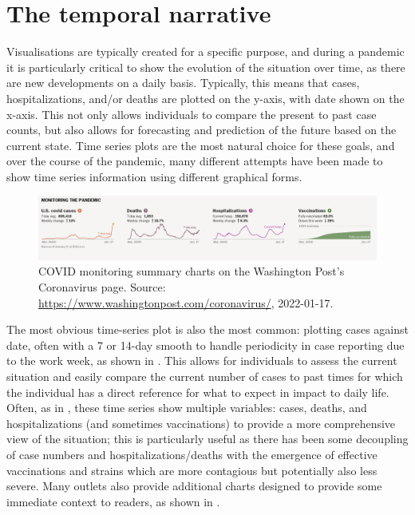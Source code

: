 \documentclass[article]{jdssv}\usepackage[]{graphicx}\usepackage[]{color}
\begin{document}




\section{The temporal narrative}

Visualisations are typically created for a specific purpose, and during a pandemic it is particularly critical to show the evolution of the situation over time, as there are new developments on a daily basis. Typically, this means that cases, hospitalizations, and/or deaths are plotted on the y-axis, with date shown on the x-axis. This not only allows individuals to compare the present to past case counts, but also allows for forecasting and prediction of the future based on the current state. Time series plots are the most natural choice for these goals, and over the course of the pandemic, many different attempts have been made to show time series information using different graphical forms. 

\begin{figure}
\centering
\includegraphics[width=.99\linewidth]{wapo-covid-monitoring}
\caption{COVID monitoring summary charts on the Washington Post's Coronavirus page. Source: \url{https://www.washingtonpost.com/coronavirus/}, 2022-01-17.}
\label{fig:wapo-covid-time-series}
\end{figure}

The most obvious time-series plot is also the most common: plotting cases against date, often with a 7 or 14-day smooth to handle periodicity in case reporting due to the work week, as shown in . This allows for individuals to assess the current situation and easily compare the current number of cases to past times for which the individual has a direct reference for what to expect in impact to daily life. Often, as in , these time series show multiple variables: cases, deaths, and hospitalizations (and sometimes vaccinations) to provide a more comprehensive view of the situation; this is particularly useful as there has been some decoupling of case numbers and hospitalizations/deaths with the emergence of effective vaccinations and strains which are more contagious but potentially also less severe. Many outlets also provide additional charts designed to provide some immediate context to readers, as shown in . 
\end{document}

